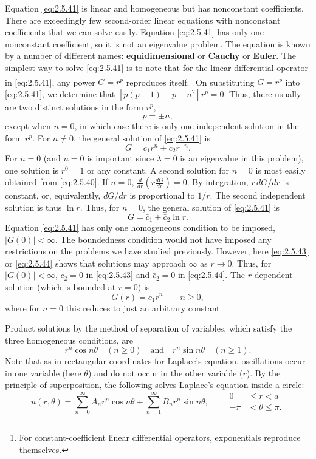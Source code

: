 Equation \eqref{eq:2.5.41} is linear and homogeneous but has nonconstant coefficients. There are exceedingly few second-order linear equations with nonconstant coefficients that we can solve easily. Equation \eqref{eq:2.5.41} has only one nonconstant coefficient, so it is not an eigenvalue problem. The equation is known by a number of different names: \textbf{equidimensional} or \textbf{Cauchy} or \textbf{Euler}. The simplest way to solve \eqref{eq:2.5.41} is to note that for the linear differential operator in \eqref{eq:2.5.41}, any power $G = r^p$ reproduces itself.\footnote{For constant-coefficient linear differential operators, exponentials reproduce themselves.} On substituting $G = r^p$ into \eqref{eq:2.5.41}, we determine that $[p(p-1) + p - n^2]r^p = 0$. Thus, there usually are two distinct solutions in the form $r^p$,
\[
p = \pm n,
\]
except when $n = 0$, in which case there is only one independent solution in the form $r^p$. For $n \ne 0$, the general solution of \eqref{eq:2.5.41} is
\begin{equation}
\label{eq:2.5.43}
G = c_1 r^n + c_2 r^{-n}.
\end{equation}
For $n = 0$ (and $n = 0$ is important since $\lambda = 0$ is an eigenvalue in this problem), one solution is $r^0 = 1$ or any constant. A second solution for $n = 0$ is most easily obtained from \eqref{eq:2.5.40}. If $n = 0$, $\frac{d}{dr}(r\frac{dG}{dr}) = 0$. By integration, $r\,dG/dr$ is constant, or, equivalently, $dG/dr$ is proportional to $1/r$. The second independent solution is thus $\ln r$. Thus, for $n = 0$, the general solution of \eqref{eq:2.5.41} is
\begin{equation}
\label{eq:2.5.44}
G = \bar{c}_1 + \bar{c}_2 \ln r.
\end{equation}
Equation \eqref{eq:2.5.41} has only one homogeneous condition to be imposed, $|G(0)| < \infty$. The boundedness condition would not have imposed any restrictions on the problems we have studied previously. However, here \eqref{eq:2.5.43} or \eqref{eq:2.5.44} shows that solutions may approach $\infty$ as $r \to 0$. Thus, for $|G(0)| < \infty$, $c_2 = 0$ in \eqref{eq:2.5.43} and $\bar{c}_2 = 0$ in \eqref{eq:2.5.44}. The $r$-dependent solution (which is bounded at $r = 0$) is
\[
G(r) = c_1 r^n \qquad n \ge 0,
\]
where for $n = 0$ this reduces to just an arbitrary constant.

Product solutions by the method of separation of variables, which satisfy the three homogeneous conditions, are
\[
r^n\cos n\theta \quad (n \ge 0) \quad\text{and}\quad r^n\sin n\theta \quad (n \ge 1).
\]
Note that as in rectangular coordinates for Laplace's equation, oscillations occur in one variable (here $\theta$) and do not occur in the other variable ($r$). By the principle of superposition, the following solves Laplace's equation inside a circle:
\begin{equation}
\label{eq:2.5.45}
\boxed{u(r,\theta) = \sum_{n=0}^{\infty} A_n r^n \cos n\theta + \sum_{n=1}^{\infty} B_n r^n \sin n\theta, \qquad \begin{aligned} 0 &\le r < a \\ -\pi &< \theta \le \pi. \end{aligned}}
\end{equation}

